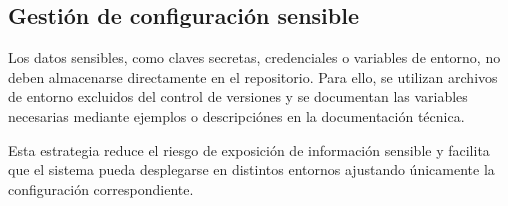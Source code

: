 \subsection{Gestión de configuración sensible}

Los datos sensibles, como claves secretas, credenciales o variables de entorno, no deben almacenarse directamente en el repositorio. Para ello, se utilizan archivos de entorno excluidos del control de versiones y se documentan las variables necesarias mediante ejemplos o descripciónes en la documentación técnica.

Esta estrategia reduce el riesgo de exposición de información sensible y facilita que el sistema pueda desplegarse en distintos entornos ajustando únicamente la configuración correspondiente.